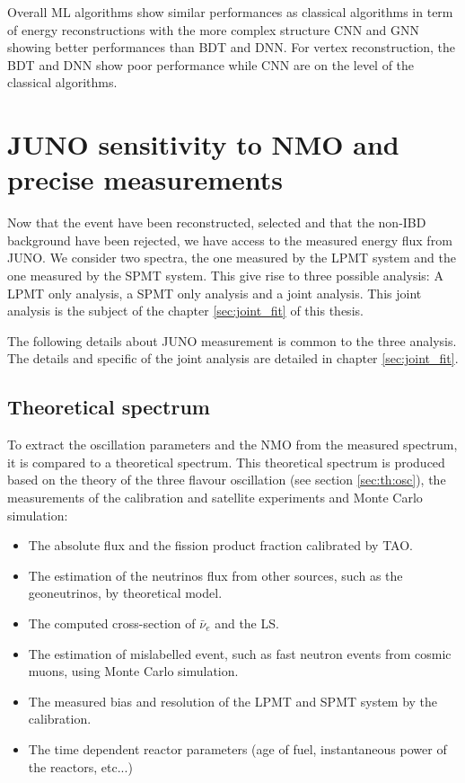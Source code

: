 Overall ML algorithms show similar performances as classical algorithms in term of energy reconstructions with the more complex structure CNN and GNN showing better performances than BDT and DNN. For vertex reconstruction, the BDT and DNN show poor performance while CNN are on the level of the classical algorithms.

\section{JUNO sensitivity to NMO and precise measurements}
\label{sec:juno:Fit}

Now that the event have been reconstructed, selected and that the non-IBD background have been rejected, we have access to the measured energy flux from JUNO. We consider two spectra, the one measured by the LPMT system and the one measured by the SPMT system. This give rise to three possible analysis: A LPMT only analysis, a SPMT only analysis and a joint analysis. This joint analysis is the subject of the chapter \ref{sec:joint_fit} of this thesis.

The following details about JUNO measurement is common to the three analysis. The details and specific of the joint analysis are detailed in chapter \ref{sec:joint_fit}.

\subsection{Theoretical spectrum}

To extract the oscillation parameters and the NMO from the measured spectrum, it is compared to a theoretical spectrum. This theoretical spectrum is produced based on the theory of the three flavour oscillation (see section \ref{sec:th:osc}), the measurements of the calibration and satellite experiments and Monte Carlo simulation:
\begin{itemize}
  \item The absolute flux and the fission product fraction calibrated by TAO.
  \item The estimation of the neutrinos flux from other sources, such as the geoneutrinos, by theoretical model.
  \item The computed cross-section of $\bar{\nu}_e$ and the LS.
  \item The estimation of mislabelled event, such as fast neutron events from cosmic muons, using Monte Carlo simulation.
  \item The measured bias and resolution of the LPMT and SPMT system by the calibration.
  \item The time dependent reactor parameters (age of fuel, instantaneous power of the reactors, etc...)
\end{itemize}


